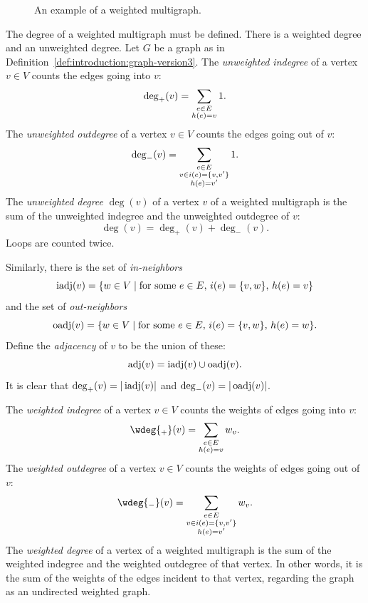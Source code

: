 \begin{figure}[!htbp]
\centering

\caption{An example of a weighted multigraph.}
\label{fig:introduction:weighted_multigraph}
\end{figure}

The degree of a weighted multigraph must be defined. There is a
weighted degree and an unweighted degree. Let $G$ be a graph as in
Definition~\ref{def:introduction:graph-version3}. The
\emph{unweighted indegree} of a vertex
$v \in V$ counts the edges going into $v$:
\[
\deg_+(v)\index{$\deg_+$}
=
\sum_{\substack{e \in E \\ h(e)=v}} 1.
\]
The \emph{unweighted outdegree} of a
vertex $v \in V$ counts the edges going out of $v$:
\[
\deg_-(v)\index{$\deg_-$}
=
\sum_{\substack{e \in E \\ v \in i(e)=\{v,v'\} \\ h(e)= v'}} 1.
\]
The \emph{unweighted degree} $\deg(v)$ of a
vertex $v$ of a weighted multigraph is the sum of the unweighted
indegree and the unweighted outdegree of $v$:
\[
\deg(v)
=
\deg_+(v) + \deg_-(v).
\]
Loops are counted twice.

Similarly, there is the set of
\emph{in-neighbors}
\[
\operatorname*{iadj}(v)
=
\{w \in V \mid \text{for some } e \in E,\, i(e)=\{v,w\},\, h(e)=v\}
\]
and the set of \emph{out-neighbors}
\[
\operatorname*{oadj}(v)
=
\{w \in V \mid \text{for some } e \in E,\, i(e)=\{v,w\},\, h(e)=w\}.
\]
Define the \emph{adjacency} of $v$ to be
the union of these:
\[
\operatorname*{adj}(v)
=
\operatorname*{iadj}(v) \cup \operatorname*{oadj}(v).
\]
It is clear that $\deg_+(v) = |\operatorname*{iadj}(v)|$ and $\deg_-(v) = |\operatorname*{oadj}(v)|$.

The \emph{weighted indegree} of a vertex
$v \in V$ counts the weights of edges going into $v$:
\[
\wdeg{_+}(v)
=
\sum_{\substack{e \in E \\ h(e)=v}} w_v.
\]
The \emph{weighted outdegree} of a vertex
$v \in V$ counts the weights of edges going out of $v$:
\[
\wdeg{_-}(v)
=
\sum_{\substack{e \in E \\ v \in i(e)=\{v,v'\} \\ h(e)= v'}} w_v.
\]
The \emph{weighted degree} of a vertex of a
weighted multigraph is the sum of the weighted indegree and the
weighted outdegree of that vertex. In other words, it is the sum of
the weights of the edges incident to that vertex, regarding the graph
as an undirected weighted graph.


